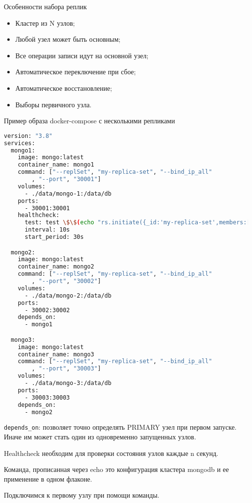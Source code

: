 Особенности набора реплик

\begin{itemize}
	\item Кластер из N узлов;
	\item Любой узел может быть основным;
	\item Все операции записи идут на основной узел;
	\item Автоматическое переключение при сбое;
	\item Автоматическое восстановление;
	\item Выборы первичного узла.
\end{itemize}

Пример образа docker-compose с несколькими репликами

\begin{lstlisting}[language=bash]
version: "3.8"
services:
  mongo1:
    image: mongo:latest
    container_name: mongo1
    command: ["--replSet", "my-replica-set", "--bind_ip_all"
		, "--port", "30001"]
    volumes:
      - ./data/mongo-1:/data/db
    ports:
      - 30001:30001
    healthcheck:
      test: test \$\$(echo "rs.initiate({_id:'my-replica-set',members:[{_id:0,host:\\"mongo1:30001\\"},{_id:1,host:\\"mongo2:30002\\"},{_id:2 ,host:\\"mongo3:30003\\"}]}, {force:true}).ok || rs.status().ok" | mongosh --port 30001 --quiet) -eq 1
      interval: 10s
      start_period: 30s

  mongo2:
    image: mongo:latest
    container_name: mongo2
    command: ["--replSet", "my-replica-set", "--bind_ip_all"
		, "--port", "30002"]
    volumes:
      - ./data/mongo-2:/data/db
    ports:
      - 30002:30002
    depends_on:
      - mongo1

  mongo3:
    image: mongo:latest
    container_name: mongo3
    command: ["--replSet", "my-replica-set", "--bind_ip_all"
		, "--port", "30003"]
    volumes:
      - ./data/mongo-3:/data/db
    ports:
      - 30003:30003
    depends_on:
      - mongo2
\end{lstlisting}

\texttt{depends\_on}: позволяет точно определять PRIMARY узел при первом
запуске. Иначе им может стать один из одновременно запущенных узлов.\par
Healthcheck необходим для проверки состояния узлов каждые n секунд.\par
Команда, прописанная через echo это конфигурация кластера mongodb и
ее применение в одном флаконе.\par
Подключимся к первому узлу при помощи команды.


